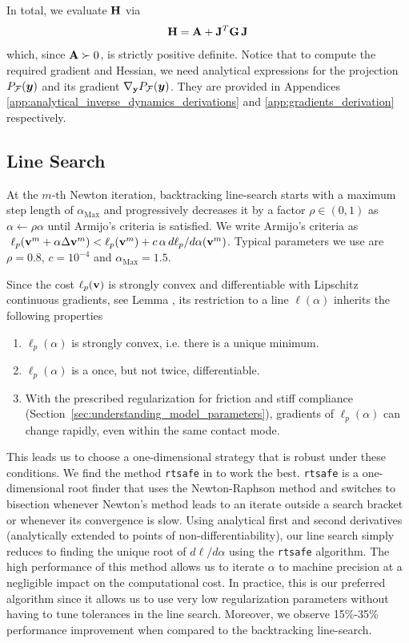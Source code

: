 In total, we evaluate ${\mathbf{H}}$ via
\begin{equation}
	\mf{H} = \mf{A} + \mf{J}^T\mf{G}\,\mf{J}
	\label{eq:ell_hessian}
\end{equation}
which, since ${\mathbf{A}}\succ 0$, is strictly positive definite. Notice
that to compute the required gradient and Hessian, we need analytical expressions
for the projection $P_\mathcal{F}({\bm{y}})$ and its gradient
$\nabla_{\mathbf{y}}P_\mathcal{F}({\bm{y}})$. They are provided in Appendices
\ref{app:analytical_inverse_dynamics_derivations} and
\ref{app:gradients_derivation} respectively.

\subsection{Line Search}

At the $m\text{-th}$ Newton iteration, backtracking line-search starts with a
maximum step length of $\alpha_\text{Max}$ and progressively decreases it
by a factor $\rho \in (0, 1)$ as $\alpha\gets\rho\alpha$ until Armijo's
criteria \cite[\S 3.1]{bib:nocedal2006numerical} is satisfied. We write Armijo's
criteria as $~\ell_p({\mathbf{v}}^m + \alpha \Delta{\mathbf{v}}^{m}) < \ell_p({\mathbf{v}}^m) +
c\,\alpha\,d\ell_p/d\alpha({\mathbf{v}}^m)$. Typical parameters we use are
$\rho=0.8$, $c=10^{-4}$ and $\alpha_\text{Max}=1.5$.

Since the cost $\ell_p({\mathbf{v}})$ is strongly convex and differentiable with
Lipschitz continuous gradients, see Lemma , its restriction to a line $\ell(\alpha)$ inherits the following
properties
\begin{enumerate}
	\item $\ell_p(\alpha)$ is strongly convex, i.e. there is a unique minimum.
	\item $\ell_p(\alpha)$ is a once, but not twice, differentiable. 
      \item With the prescribed regularization for friction 
        and stiff compliance (Section~\ref{sec:understanding_model_parameters}),
	gradients of $\ell_p(\alpha)$ can change rapidly, even within 
        the same contact mode.
\end{enumerate}

This leads us to choose a one-dimensional strategy that is robust under these
conditions. We find the method \verb;rtsafe; in \cite[\S
9.4]{bib:numerical_recipes} to work the best. \verb;rtsafe; is a one-dimensional
root finder that uses the Newton-Raphson method and switches to bisection
whenever Newton's method leads to an iterate outside a search bracket or
whenever its convergence is slow. Using analytical first and second derivatives
(analytically extended to points of non-differentiability),
our line search simply reduces to finding the unique root of $d\ell/d\alpha$
using the \verb;rtsafe; algorithm. The high performance of this method allows us 
to iterate $\alpha$ to machine precision at a negligible impact on the
computational cost. In practice, this is our preferred algorithm since it allows
us to use very low regularization parameters without having to tune tolerances
in the line search. Moreover, we observe 15\%-35\% performance improvement when
compared to the backtracking line-search.

